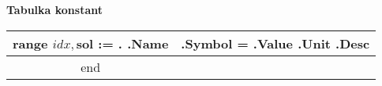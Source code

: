 \documentclass[a4paper,11pt]{article}
\begin{document}
\center\sf\large{\textbf{ Tabulka konstant }} \\
\setlength\itemsep{-1pt}
\begin{longtable}{|c|c|}
\\ \hline
{{range $idx, $sol := .}}
  \textbf{ {{.Name}} } & {{.Symbol}} = {{.Value}} {{.Unit}} {{.Desc}}
  \\ \hline
{{end}}
\end{longtable}
\end{document}
